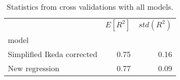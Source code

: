 
\begin{table}[H]
    \centering
    \caption{Statistics from cross validations with all models.}
   \begin{tabular}{lrr}
\toprule
{} &  $E[R^2]$ &  $std(R^2)$ \\
model                      &           &             \\
\midrule
Simplified Ikeda corrected &      0.75 &        0.16 \\
New regression             &      0.77 &        0.09 \\
\bottomrule
\end{tabular}

    \label{tab:crossvalidation}
\end{table}
    